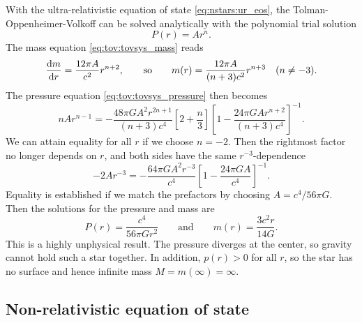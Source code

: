 With the ultra-relativistic equation of state \eqref{eq:nstars:ur_eos}, the Tolman-Oppenheimer-Volkoff can be solved analytically with the polynomial trial solution
\begin{equation}
	P(r) = A r^n .
\label{eq:nstars:ur_ansatz}
\end{equation}
The mass equation \eqref{eq:tov:tovsys_mass} reads
\begin{equation}
	\odv{m}{r} = \frac{12 \pi A}{c^2} r^{n+2},
	\qquad \text{so} \qquad
	m(r) = \frac{12 \pi A}{(n+3) c^2} r^{n+3}
	\quad (n \neq -3).
\label{eq:nstars:ur_mass}
\end{equation}
The pressure equation \eqref{eq:tov:tovsys_pressure} then becomes
\begin{equation}
	n A r^{n-1} =
	-\frac{48 \pi G A^2 r^{2n+1}}{(n+3) c^4} \left[ 2 + \frac{n}{3} \right] \left[ 1 - \frac{24 \pi G A r^{n+2}}{(n+3) c^4} \right]^{-1} .
\end{equation}
We can attain equality for all $r$ if we choose $n = -2$.
Then the rightmost factor no longer depends on $r$, and both sides have the same $r^{-3}$-dependence
\begin{equation}
	- 2 A r^{-3} = - \frac{64 \pi G A^2 r^{-3}}{c^4} \left[ 1 - \frac{24 \pi G A}{c^4} \right]^{-1} .
\end{equation}
Equality is established if we match the prefactors by choosing $A = c^4 / 56 \pi G$.
Then the solutions for the pressure and mass are
\begin{equation}
	P(r) = \frac{c^4}{56 \pi G r^2}
	\qquad \text{and} \qquad
	m(r) = \frac{3 c^2 r}{14 G} .
\end{equation}
This is a highly unphysical result.
The pressure diverges at the center, so gravity cannot hold such a star together.
In addition, $p(r) > 0$ for all $r$, so the star has no surface and hence infinite mass $M = m(\infty) = \infty$.

\subsection{Non-relativistic equation of state}
\label{sec:nstars:nr_limit_solve}

